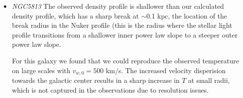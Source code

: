 \documentclass[usenatbib,fleqn]{mn2e}
\newcommand{\vwO}{v_{w,0}}
\begin{document}
\begin{itemize}


\item \emph{NGC5813} %
  The observed density profile \citealt{RussellMcNamara+:2013a} is
  shallower than our calculated density profile, which has a sharp
  break at $\sim$0.1 kpc, the location of the break radius in the
  Nuker profile (this is the radius where the stellar light profile
  transitions from a shallower inner power law slope to a steeper
  outer power law slope.

  For this galaxy we found that we could reproduce the observed
  temperature on large scales with $\vwO=500$ km/s. The increased
  velocity disperision towards the galactic center results in a sharp
  increase in $T$ at small radii, which is not captured in the
  observations due to resolution issues.
\end{itemize}
\end{document}

